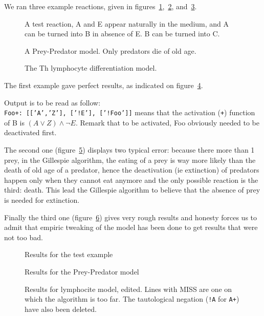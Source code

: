 \documentclass{llncs}
\begin{document}
We ran three example reactions, given in figures~\ref{test},~\ref{preypred}, and~\ref{lympho}.
\begin{figure}[htbp]
	
	\vspace{-1em}
	\caption{A test reaction, A and E appear naturally in the medium, and A can be turned into B in absence of E. B  can be turned into C.\label{test}}
\end{figure}
\begin{figure}[htbp]
	
	\vspace{-1em}
	\caption{A Prey-Predator model. Only predators die of old age.\label{preypred}}
\end{figure}
\begin{figure}[htbp]
	
	\vspace{-1em}
	\caption{The Th lymphocyte differentiation model.\label{lympho}}
\end{figure}

The first example gave perfect results, as indicated on figure~\ref{test_res}.

Output is to be read as follow:\\
\texttt{Foo+:~[['A','Z'],~['!E'],~['!Foo']]} means that the activation (\texttt{+}) function of B is $(A \vee Z)\wedge\neg E$. Remark that to be activated, Foo obviously needed to be deactivated first.

The second one (figure~\ref{preypred_res}) displays two typical error: because there more than 1 prey, in the Gillespie algorithm, the eating of a prey is way more likely than the death of old age of a predator, hence the deactivation (ie extinction) of predators happen only when they cannot eat anymore and the only possible reaction is the third: death. This lead the Gillespie algorithm to believe that the absence of prey is needed for extinction.

Finally the third one (figure~\ref{lympho_res}) gives very rough results and honesty forces us to admit that empiric tweaking of the model has been done to get results that were not too bad.

\begin{figure}
	
	\caption{Results for the test example\label{test_res}}
\end{figure}
\begin{figure}
	
	\caption{Results for the Prey-Predator model\label{preypred_res}}
\end{figure}
\begin{figure}
	
	\caption{Results for lymphocite model, edited. Lines with MISS are one on which the algorithm is too far. The tautological negation (\texttt{!A} for \texttt{A+}) have also been deleted.\label{lympho_res}}
\end{figure}
\end{document}
